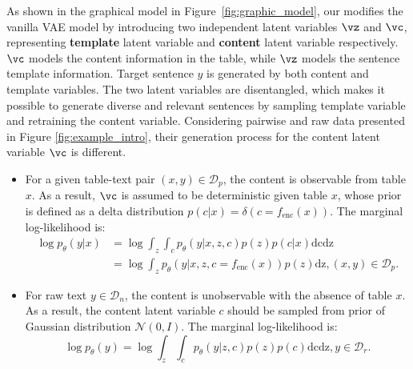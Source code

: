 

As shown in the graphical model in Figure~\ref{fig:graphic_model}, our \method modifies the vanilla VAE model by introducing two independent latent variables $\vz$ and $\vc$, representing \textbf{template} latent variable and \textbf{content} latent variable respectively. $\vc$ models the content information in the table, while $\vz$ models the sentence template information. Target sentence $y$ is generated by both content and template variables. The two latent variables are disentangled, which makes it possible to generate diverse and relevant sentences by sampling template variable and retraining the content variable.
Considering pairwise and raw data presented in Figure \ref{fig:example_intro}, their generation process for the content latent variable $\vc$ is different. 


\begin{itemize}[leftmargin=2em, topsep=0pt]
    \item For a given table-text pair $(x,y) \in \mathcal{D}_p$, the content is observable from table $x$. As a result, $\vc$ is assumed to be deterministic given table $x$, whose prior is defined as a delta distribution $p(c|x) = \delta(c=f_{\text{enc}}(x))$. The marginal log-likelihood is:
    \begin{equation}\label{eq:mll_parallel}
    \begin{split}
        \log p_\theta(y|x) & = \log \int_z \int_c p_\theta(y|x,z,c) p(z) p(c|x) \text{dc}\text{dz} \\
        & = \log \int_z p_\theta(y|x,z,c=f_{\text{enc}}(x)) p(z) \text{dz}, (x,y) \in \mathcal{D}_p.
    \end{split}
    \end{equation}
    \item For raw text $y \in \mathcal{D}_n$, the content is unobservable with the absence of table $x$. As a result, the content latent variable $c$ should be sampled from prior of Gaussian distribution $\mathcal{N}(0,I)$. The marginal log-likelihood is:
    \begin{equation}
        \log p_\theta(y) = \log \int_z \int_c p_\theta(y|z,c) p(z) p(c)\text{dcdz},  y \in \mathcal{D}_r.
        \label{eq:mll_non-parallel}
    \end{equation}

\end{itemize}






















